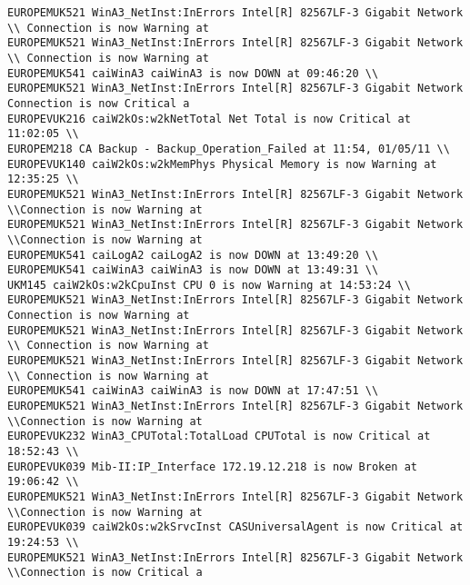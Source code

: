 \begin{lstlisting}
EUROPEMUK521 WinA3_NetInst:InErrors Intel[R] 82567LF-3 Gigabit Network \\ Connection is now Warning at
EUROPEMUK521 WinA3_NetInst:InErrors Intel[R] 82567LF-3 Gigabit Network \\ Connection is now Warning at
EUROPEMUK541 caiWinA3 caiWinA3 is now DOWN at 09:46:20 \\
EUROPEMUK521 WinA3_NetInst:InErrors Intel[R] 82567LF-3 Gigabit Network Connection is now Critical a
EUROPEVUK216 caiW2kOs:w2kNetTotal Net Total is now Critical at 11:02:05 \\
EUROPEM218 CA Backup - Backup_Operation_Failed at 11:54, 01/05/11 \\
EUROPEVUK140 caiW2kOs:w2kMemPhys Physical Memory is now Warning at 12:35:25 \\
EUROPEMUK521 WinA3_NetInst:InErrors Intel[R] 82567LF-3 Gigabit Network  \\Connection is now Warning at
EUROPEMUK521 WinA3_NetInst:InErrors Intel[R] 82567LF-3 Gigabit Network \\Connection is now Warning at
EUROPEMUK541 caiLogA2 caiLogA2 is now DOWN at 13:49:20 \\
EUROPEMUK541 caiWinA3 caiWinA3 is now DOWN at 13:49:31 \\
UKM145 caiW2kOs:w2kCpuInst CPU 0 is now Warning at 14:53:24 \\
EUROPEMUK521 WinA3_NetInst:InErrors Intel[R] 82567LF-3 Gigabit Network Connection is now Warning at
EUROPEMUK521 WinA3_NetInst:InErrors Intel[R] 82567LF-3 Gigabit Network \\ Connection is now Warning at
EUROPEMUK521 WinA3_NetInst:InErrors Intel[R] 82567LF-3 Gigabit Network \\ Connection is now Warning at
EUROPEMUK541 caiWinA3 caiWinA3 is now DOWN at 17:47:51 \\
EUROPEMUK521 WinA3_NetInst:InErrors Intel[R] 82567LF-3 Gigabit Network \\Connection is now Warning at
EUROPEVUK232 WinA3_CPUTotal:TotalLoad CPUTotal is now Critical at 18:52:43 \\
EUROPEVUK039 Mib-II:IP_Interface 172.19.12.218 is now Broken at 19:06:42 \\
EUROPEMUK521 WinA3_NetInst:InErrors Intel[R] 82567LF-3 Gigabit Network \\Connection is now Warning at
EUROPEVUK039 caiW2kOs:w2kSrvcInst CASUniversalAgent is now Critical at 19:24:53 \\
EUROPEMUK521 WinA3_NetInst:InErrors Intel[R] 82567LF-3 Gigabit Network \\Connection is now Critical a

\end{lstlisting}
